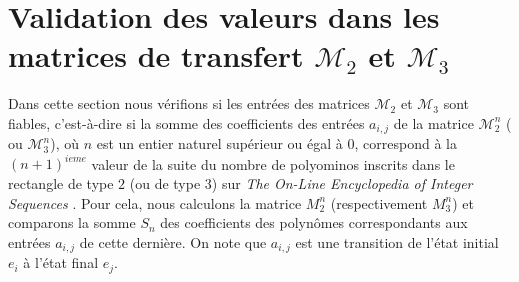 \section{Validation des valeurs dans les matrices de transfert $\mathcal{M}_{2}$ et $\mathcal{M}_{3}$}
Dans cette section nous vérifions si les entrées des matrices $\mathcal{M}_{2}$ et $\mathcal{M}_{3}$ sont fiables, c'est-à-dire si la somme des coefficients des entrées $a_{i,j}$  de la  matrice $\mathcal{M}_{2}^{n}$ ( ou  $\mathcal{M}_{3}^{n}$), où $n$ est un entier naturel supérieur ou égal à $0$, correspond à la $(n+1)^{ieme}$ valeur de  la suite du nombre de polyominos inscrits dans le rectangle de type $2$ (ou de type $3$) sur  \emph{The On-Line Encyclopedia of Integer Sequences} \citep{Oeis,Oeis2}. Pour cela, nous calculons la matrice $M_{2}^{n}$ (respectivement $M_{3}^{n}$) et comparons la somme $S_{n}$ des coefficients des polynômes correspondants aux entrées $a_{i,j}$ de cette dernière. On note que $a_{i,j}$ est une transition de  l'état initial $e_{i}$ à l'état final  $e_{j}$.
